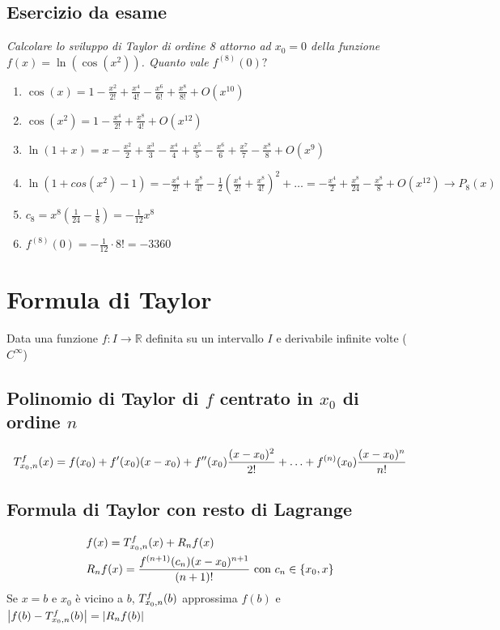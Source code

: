\documentclass[10pt, a4paper]{article}
\begin{document}
        \subsection{Esercizio da esame}
        \textit{Calcolare lo sviluppo di Taylor di ordine 8 attorno ad $x_0=0$ della funzione $f(x)=\ln(\cos(x^2))$. Quanto vale $f^{(8)}(0)?$}
        \begin{enumerate}
            \item $\displaystyle \cos(x)=1-\frac{x^2}{2!}+\frac{x^4}{4!}-\frac{x^6}{6!}+\frac{x^8}{8!}+O(x^{10})$
            \item $\displaystyle \cos(x^2) = 1-\frac{x^4}{2!}+\frac{x^8}{4!}+O(x^{12})$
            \item $\displaystyle \ln(1+x)=x-\frac{x^2}{2}+\frac{x^3}{3}-\frac{x^4}{4}+\frac{x^5}{5}-\frac{x^6}{6}+\frac{x^7}{7}-\frac{x^8}{8}+O(x^9)$
            \item $\displaystyle \ln(1+cos(x^2)-1)=-\frac{x^4}{2!}+\frac{x^8}{4!}-\frac{1}{2}\left(\frac{x^4}{2!}+\frac{x^8}{4!}\right)^2+\ldots=-\frac{x^4}{2}+\frac{x^8}{24}-\frac{x^8}{8}+O(x^12)\rightarrow P_8(x)$
            \item $\displaystyle c_8=x^8\left(\frac{1}{24}-\frac{1}{8}\right)=-\frac{1}{12}x^8$
            \item $\displaystyle f^{(8)}(0)=-\frac{1}{12}\cdot 8!=-3360$
        \end{enumerate}
\section{Formula di Taylor}
    Data una funzione $f:I\rightarrow\mathbb{R}$ definita su un intervallo $I$ e derivabile infinite volte ($C^{\infty}$)
    \subsection{Polinomio di Taylor di $f$ centrato in $x_0$ di ordine $n$}
        \begin{equation*}
            \taylor{f}{x_0}{n}(x) = f(x_0)+f'(x_0)(x-x_0)+f''(x_0)\frac{(x-x_0)^2}{2!}+\ldots+f^{(n)}(x_0)\frac{(x-x_0)^n}{n!}
        \end{equation*}
    \subsection{Formula di Taylor con resto di Lagrange}
        \begin{equation*}
            \begin{split}
                &f(x) = \taylor{f}{x_0}{n}(x) + R_nf(x)\\
                &R_nf(x) = \frac{f^{(n+1)}(c_n)(x-x_0)^{n+1}}{(n+1)!} \text{ con } c_n\in\{x_0,x\}
            \end{split}
        \end{equation*}
        Se $x=b$ e $x_0$ è vicino a $b$, $\taylor{f}{x_0}{n}(b)$ approssima $f(b)$ e $\left|f(b)-\taylor{f}{x_0}{n}(b)\right| = \left|R_nf(b)\right|$
\end{document}
